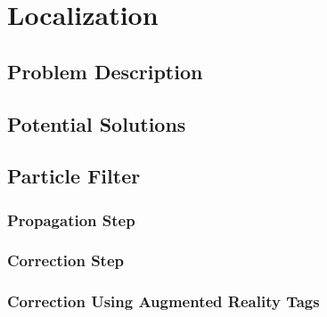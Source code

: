 
\chapter{Localization\label{ch:localization}}

\section{Problem Description}

\section{Potential Solutions}

\section{Particle Filter}

\subsection{Propagation Step}

\subsection{Correction Step}

\subsection{Correction Using Augmented Reality Tags}

